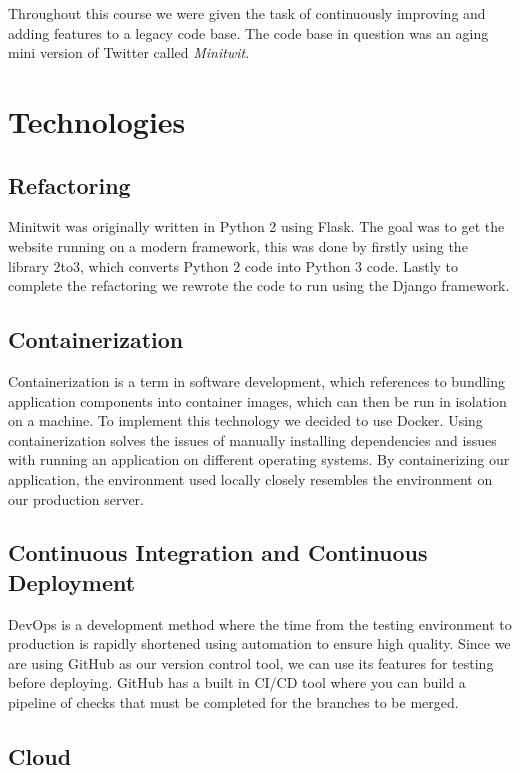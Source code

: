 Throughout this course we were given the task of continuously improving and adding features to a legacy code base. The code base in question was an aging mini version of Twitter called \textit{Minitwit}. 

\section*{Technologies}

\subsection*{Refactoring}

Minitwit was originally written in Python 2 using Flask. The goal was to get the website running on a modern framework, this was done by firstly using the library 2to3, which converts Python 2 code into Python 3 code. Lastly to complete the refactoring we rewrote the code to run using the Django framework.

\subsection*{Containerization}

Containerization is a term in software development, which references to bundling application components into container images, which can then be run in isolation on a machine. To implement this technology we decided to use Docker. Using containerization solves the issues of manually installing dependencies and issues with running an application on different operating systems. By containerizing our application, the environment used locally closely resembles the environment on our production server.

\subsection*{Continuous Integration and Continuous Deployment}

DevOps is a development method where the time from the testing environment to production is rapidly shortened using automation to ensure high quality. Since we are using GitHub as our version control tool, we can use its features for testing before deploying. GitHub has a built in CI/CD tool where you can build a pipeline of checks that must be completed for the branches to be merged.

\subsection*{Cloud}

